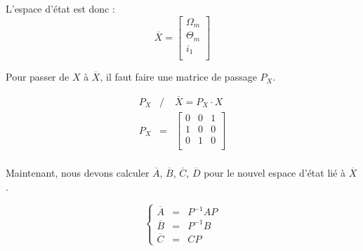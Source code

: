 \noindent\textbullet\hspace{2mm} L'espace d'état est donc : 
\begin{equation}
\overline{X} = \begin{bmatrix}
\Omega_m\\
\Theta_m\\
i_1\\
\end{bmatrix}
\end{equation}

Pour passer de $X$ à $\overline{X}$, il faut faire une matrice de passage $P_X$.

 \begin{eqnarray}
 P_X &/&  \overline{X} =P_X \cdot X \\
 P_X &=&\begin{bmatrix}
 0 & 0 & 1 \\
 1 & 0 & 0 \\
 0 & 1 & 0 \\
\end{bmatrix}  \\
 \end{eqnarray}

Maintenant, nous devons calculer $\overline{A}$, $\overline{B}$, $\overline{C}$, $\overline{D}$ pour le nouvel espace d'état lié à $\overline{X}$.

\begin{equation}%
	\left\lbrace%
	\begin{matrix}
		\overline{A} &=& P^{-1} A P \\%
		\overline{B} &=& P^{-1} B \\%
		\overline{C} &=& C P%
	\end{matrix}
\right.%
\end{equation}
